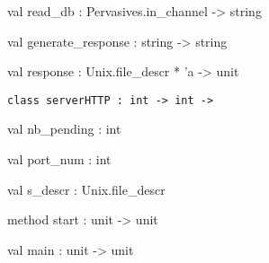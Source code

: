 \documentclass[11pt]{article}
\begin{document}
\label{val:Server.read-underscoredb}\begin{ocamldoccode}
val read_db : Pervasives.in_channel -> string
\end{ocamldoccode}




\label{val:Server.generate-underscoreresponse}\begin{ocamldoccode}
val generate_response : string -> string
\end{ocamldoccode}




\label{val:Server.response}\begin{ocamldoccode}
val response : Unix.file_descr * 'a -> unit
\end{ocamldoccode}




\begin{ocamldoccode}
{\tt{class serverHTTP : }}{\tt{int -> int -> }}\end{ocamldoccode}
\label{class:Server.serverHTTP}

\begin{ocamldocobjectend}


\label{val:Server.serverHTTP.nb-underscorepending}\begin{ocamldoccode}
val nb_pending : int
\end{ocamldoccode}


\label{val:Server.serverHTTP.port-underscorenum}\begin{ocamldoccode}
val port_num : int
\end{ocamldoccode}


\label{val:Server.serverHTTP.s-underscoredescr}\begin{ocamldoccode}
val s_descr : Unix.file_descr
\end{ocamldoccode}


\label{method:Server.serverHTTP.start}\begin{ocamldoccode}
method start : unit -> unit
\end{ocamldoccode}
\end{ocamldocobjectend}






\label{val:Server.main}\begin{ocamldoccode}
val main : unit -> unit
\end{ocamldoccode}
\end{document}
